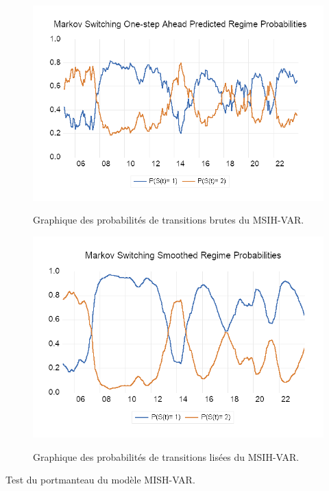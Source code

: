 \begin{figure}[H]
    \centering
    \caption{Graphique des probabilités de transitions brutes du MSIH-VAR.}
    \includegraphics[scale=0.8]{annexes/msih_onestep.png}
    \label{fig:graph_prob_brutes}
\end{figure}

\begin{figure}[H]
    \centering
    \caption{Graphique des probabilités de transitions lisées du MSIH-VAR.}
    \includegraphics[scale=0.8]{annexes/msih_smoothed.png}
    \label{fig:graph_prob_lissees}
\end{figure}

\begin{table}[H]
    \centering
    \sffamily
    \caption{Test du portmanteau du modèle MISH-VAR.}
    \label{tab:test_portmanteau_var)}
    \resizebox{1\textwidth}{!}{}
\end{table}

